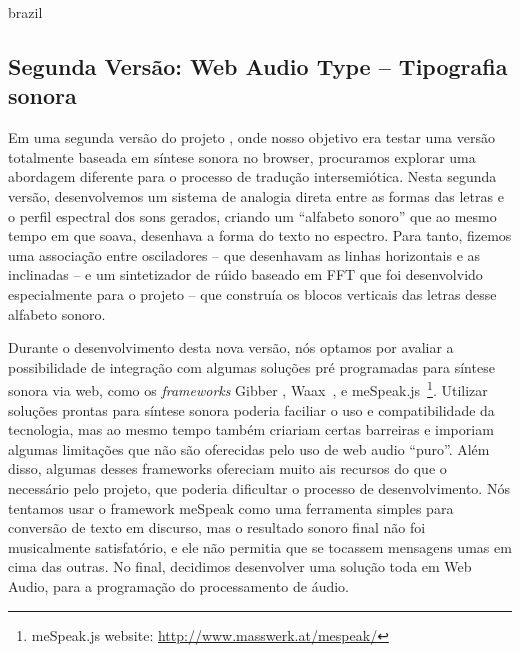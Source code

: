 \begin{otherlanguage*}{brazil}
\subsection{Segunda Versão: Web Audio Type -- Tipografia sonora}
Em uma segunda versão do projeto \cite{Stolfi2017w}, onde nosso objetivo era testar uma versão totalmente baseada em síntese sonora no browser, procuramos explorar uma abordagem diferente para o processo de tradução intersemiótica. Nesta segunda versão, desenvolvemos um sistema de analogia direta entre as formas das letras e o perfil espectral dos sons gerados, criando um ``alfabeto sonoro'' que ao mesmo tempo em que soava, desenhava a forma do texto no espectro. Para tanto, fizemos uma associação entre osciladores -- que desenhavam as linhas horizontais e as inclinadas -- e um sintetizador de rúido baseado em FFT que foi desenvolvido especialmente para o projeto -- que construía os blocos verticais das letras desse alfabeto sonoro.

Durante o desenvolvimento desta nova versão, nós optamos por avaliar a possibilidade de integração com algumas soluções pré programadas para síntese sonora via web, como os \emph{frameworks} Gibber \cite{Roberts2012gibberlivecoding}, Waax~\cite{Choi2013waax}, e meSpeak.js~\footnote{meSpeak.js website: \url{http://www.masswerk.at/mespeak/}}. Utilizar soluções prontas para síntese sonora poderia faciliar o uso e compatibilidade da tecnologia, mas ao mesmo tempo também criariam certas barreiras e imporiam algumas limitações que não são oferecidas pelo uso de web audio ``puro''. Além disso, algumas desses frameworks ofereciam muito ais recursos do que o necessário pelo projeto, que poderia dificultar o processo de desenvolvimento. Nós tentamos usar o framework meSpeak como uma ferramenta simples para conversão de texto em discurso, mas o resultado sonoro final não foi musicalmente satisfatório, e ele não permitia que se tocassem mensagens umas em cima das outras. No final, decidimos desenvolver uma solução toda em Web Audio, para a programação do processamento de áudio.




\end{otherlanguage*}
